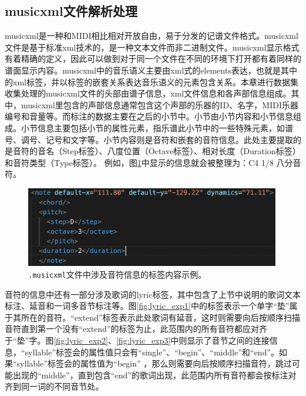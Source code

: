 \subsection{musicxml文件解析处理}
musicxml是一种和MIDI相比相对开放自由，易于分发的记谱文件格式。musicxml文件是基于标准xml技术的，是一种文本文件而非二进制文件。musicxml显示格式有着精确的定义，因此可以做到对于同一个文件在不同的环境下打开都有着同样的谱面显示内容。musicxml中的音乐语义主要由xml式的elements表达，也就是其中的xml标签，并以标签的嵌套关系表达音乐语义的元素包含关系。本章进行数据集收集处理的musicxml文件的头部由谱子信息，xml文件信息和各声部信息组成。其中，musicxml里包含的声部信息通常包含这个声部的乐器的ID、名字，MIDI乐器编号和音量等。而标注的数据主要在之后的小节中。小节由小节内容和小节信息组成。小节信息主要包括小节的属性元素，指乐谱此小节中的一些特殊元素，如谱号、调号、记号和文字等。小节内容则是音符和嵌套的音符信息。此处主要提取的是音符的音名（Step标签）、八度位置（Octave标签）、相对长度（Duration标签）和音符类型（Type标签）。
例如，图\ref{fig:musicxml_exp}中显示的信息就会被整理为：C4 1/8 八分音符。
\begin{figure}[ht]
    \centering
    \includegraphics[width=0.99\textwidth]{figure/ast/musicxml_exp.png}
    \caption{\texttt{.musicxml}文件中涉及音符信息的标签内容示例。}
    \label{fig:musicxml_exp}
\end{figure}
音符的信息中还有一部分涉及歌词的lyric标签，其中包含了上节中说明的歌词文本标注、延音和一词多音节标注等。图\ref{fig:lyric_exp1}中的标签表示一个单字``垫''属于其所在的音符。``extend''标签表示此处歌词有延音，这时则需要向后按顺序扫描音符直到第一个没有``extend''的标签为止，此范围内的所有音符都应对齐于``垫''字。图\ref{fig:lyric_exp2}、\ref{fig:lyric_exp3}中则显示了音节之间的连接信息，``syllable''标签会的属性值只会有``single''、``begin''、``middle''和``end''。如果``syllable''标签会的属性值为``begin''
，那么则需要向后按顺序扫描音符，跳过可能出现的``middle''，直到包含``end''的歌词出现，此范围内所有音符都会按标注对齐到同一词的不同音节处。
